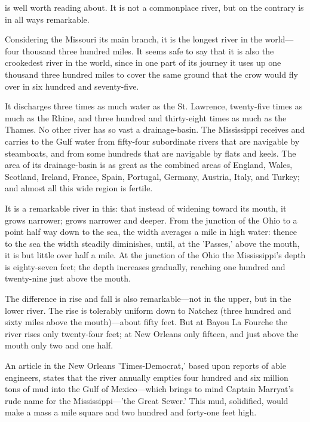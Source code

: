 \documentclass[../interior-demo.tex]{subfiles}
\begin{document}
\begin{opening}
\null\null\null\null\null
{}
\null\null
{}
\null\null\null\null\null
\end{opening}

 is well worth reading about. It is not a
commonplace river, but on the contrary is in all ways remarkable.


Considering the
Missouri its main branch, it is the longest river in the world---four
thousand three hundred miles. It seems safe to say that it is also the
crookedest river in the world, since in one part of its journey it uses
up one thousand three hundred miles to cover the same ground that the
crow would fly over in six hundred and seventy-five.

It discharges three
times as much water as the St. Lawrence, twenty-five times as much
as the Rhine, and three hundred and thirty-eight times as much as the
Thames. No other river has so vast a drainage-basin. The
Mississippi receives and carries to the Gulf water from fifty-four
subordinate rivers that are navigable by steamboats, and from some
hundreds that are navigable by flats and keels. The area of its
drainage-basin is as great as the combined areas of England, Wales,
Scotland, Ireland, France, Spain, Portugal, Germany, Austria, Italy,
and Turkey; and almost all this wide region is fertile.

It is a remarkable river in this: that instead of widening toward its
mouth, it grows narrower; grows narrower and deeper. From the junction
of the Ohio to a point half way down to the sea, the width averages a
mile in high water: thence to the sea the width steadily diminishes,
until, at the 'Passes,' above the mouth, it is but little over half
a mile. At the junction of the Ohio the Mississippi's depth is
eighty-seven feet; the depth increases gradually, reaching one hundred
and twenty-nine just above the mouth.

The difference in rise and fall is also remarkable---not in the upper,
but in the lower river. The rise is tolerably uniform down to Natchez
(three hundred and sixty miles above the mouth)---about fifty feet.
But at Bayou La Fourche the river rises only twenty-four feet; at New
Orleans only fifteen, and just above the mouth only two and one half.

An article in the New Orleans 'Times-Democrat,' based upon reports of
able engineers, states that the river annually empties four hundred and
six million tons of mud into the Gulf of Mexico---which brings to mind
Captain Marryat's rude name for the Mississippi---'the Great Sewer.' This
mud, solidified, would make a mass a mile square and two hundred and
forty-one feet high.
\end{document}
